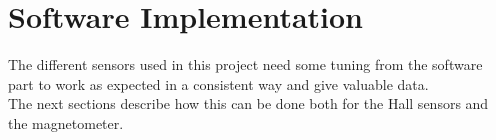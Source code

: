 \section{Software Implementation}\label{chap:sensorsImplementation}
The different sensors used in this project need some tuning from the software part to work as expected in a consistent way and give valuable data.\\
The next sections describe how this can be done both for the Hall sensors and the magnetometer.